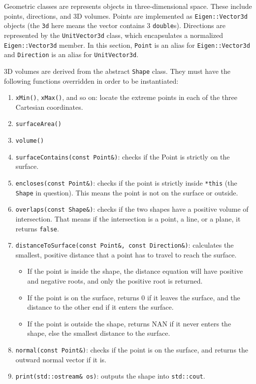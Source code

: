 Geometric classes are represents objects in three-dimensional space. These include points, directions, and 3D volumes. Points are implemented as \lstinline|Eigen::Vector3d| objects (the \lstinline|3d| here means the
vector contains 3 \lstinline|double|s). Directions are represented by the \lstinline|UnitVector3d| class, which encapsulates a normalized \lstinline|Eigen::Vector3d| member. In this section, \lstinline|Point| is an alias for
\lstinline|Eigen::Vector3d| and \lstinline|Direction| is an alias for \lstinline|UnitVector3d|.

3D volumes are derived from the abstract \lstinline|Shape| class. They must have the following functions overridden in order to be instantiated:
\begin{enumerate}
    \item \lstinline|xMin()|, \lstinline|xMax()|, and so on: locate the extreme points in each of the three Cartesian coordinates.
    \item \lstinline|surfaceArea()|
    \item \lstinline|volume()|
    \item \lstinline|surfaceContains(const Point&)|: checks if the Point is strictly on the surface.
    \item \lstinline|encloses(const Point&)|: checks if the point is strictly inside \lstinline|*this| (the \lstinline|Shape| in question). This means the point is not on the surface or outside.
    \item \lstinline|overlaps(const Shape&)|: checks if the two shapes have a positive volume of intersection. That means if the intersection is a point, a line, or a plane, it returns \lstinline|false|.
    \item \lstinline|distanceToSurface(const Point&, const Direction&)|: calculates the smallest, positive distance that a point has to travel to reach the surface.
    \begin{itemize}
        \item If the point is inside the shape, the distance equation will have positive and negative roots, and only the positive root is returned.
        \item If the point is on the surface, returns 0 if it leaves the surface, and the distance to the other end if it enters the surface.
        \item If the point is outside the shape, returns NAN if it never enters the shape, else the smallest distance to the surface.
    \end{itemize}
    \item \lstinline|normal(const Point&)|: checks if the point is on the surface, and returns the outward normal vector if it is.
    \item \lstinline|print(std::ostream& os)|: outputs the shape into \lstinline|std::cout|.
\end{enumerate}

